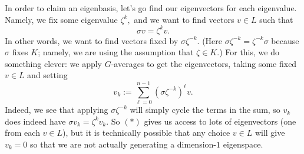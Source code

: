 \documentclass[../notes.tex]{subfiles}
\begin{document}
In order to claim an eigenbasis, let's go find our eigenvectors for each eigenvalue. Namely, we fix some eigenvalue $\zeta^k,$ and we want to find vectors $v\in L$ such that
\[\sigma v=\zeta^kv.\]
In other words, we want to find vectors fixed by $\sigma\zeta^{-k}.$ (Here $\sigma\zeta^{-k}=\zeta^{-k}\sigma$ because $\sigma$ fixes $K$; namely, we are using the assumption that $\zeta\in K.$) For this, we do something clever: we apply $G$-averages to get the eigenvectors, taking some fixed $v\in L$ and setting
\[v_k:=\sum_{\ell=0}^{n-1}\left(\sigma\zeta^{-k}\right)^\ell v.\]
Indeed, we see that applying $\sigma\zeta^{-k}$ will simply cycle the terms in the sum, so $v_k$ does indeed have $\sigma v_k=\zeta^kv_k.$ So $(*)$ gives us access to lots of eigenvectors (one from each $v\in L$), but it is technically possible that any choice $v\in L$ will give $v_k=0$ so that we are not actually generating a dimension-$1$ eigenspace.
\end{document}
